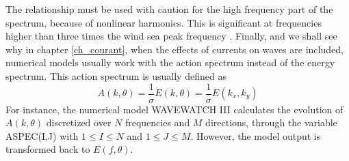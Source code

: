 The relationship must be used with caution for the high frequency part of the spectrum, because of nonlinear harmonics. This is significant at frequencies higher than three times the wind sea peak frequency \citep{Leckler&al.2015,Peureux&al.2018}. 
Finally, and we shall see why in chapter \ref{ch_courant}, when the effects of currents on  waves are included, numerical models 
usually work with the action spectrum instead of the energy spectrum. This action spectrum is usually defined as 
 \begin{equation}
A(k,\theta)=\frac{1}{\sigma}E(k,\theta)=\frac{1}{\sigma}E(k_{x},k_{y})
\label{eq3.10}
\end{equation}
For instance, the numerical model WAVEWATCH III \citep{Tolman&Booij1998} calculates the evolution of $A(k,\theta)$ discretized over
 $N$ frequencies and $M$ directions, through the variable ASPEC(I,J) with $1 \leq I \leq N $ and $1 \leq J \leq M $. However, 
the model output is transformed back to $E(f,\theta)$.
 

